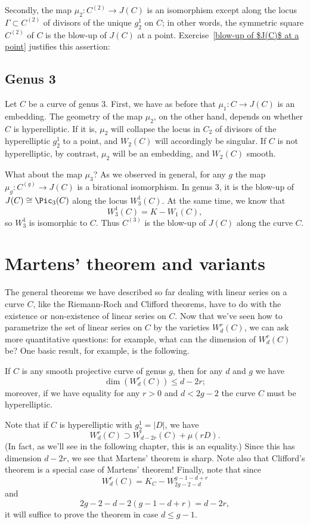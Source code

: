 Secondly, the map $\mu_2 : C^{(2)} \to J(C)$ is an isomorphism except along the locus $\Gamma \subset  C^{(2)} $ of divisors of the unique $g^1_2$ on $C$; in other words, the symmetric square $ C^{(2)} $ of $C$ is the blow-up of $J(C)$ at a point. Exercise~\ref{blow-up of $J(C)$ at a point} justifies this assertion:


\subsection{Genus 3}

Let $C$ be a curve of genus 3. First, we have as before that $\mu_1 : C \to J(C)$ is an embedding. The geometry of the map $\mu_2$, on the other hand, depends on whether  $C$ is hyperelliptic. If it is, $\mu_2$ will collapse the locus in $C_2$ of divisors of the hyperelliptic $g^1_2$ to a point, and $W_2(C)$ will accordingly be singular. If $C$ is not hyperelliptic, by contrast, $\mu_2$ will be an embedding, and $W_2(C)$ smooth.

What about the map $\mu_3$? As we observed in general, for any $g$ the map $\mu_g : C^{(g)} \to J(C)$ is a birational isomorphism. In genus 3, it is the blow-up of $J(C) \cong \Pic_3(C)$ along the locus $W^1_3(C)$. At the same time, we know that
$$
W^1_3(C) = K - W_1(C),
$$
so $W^1_3$ is isomorphic to $C$. Thus $C^{(3)}$ is the blow-up of $J(C)$ along the curve $C$.

\section{Martens' theorem and variants}

The general theorems we have described so far dealing with linear series on a curve $C$, like the Riemann-Roch and Clifford theorems, have to do with the existence or non-existence of linear series on $C$. Now that we've seen how to parametrize the set of linear series on $C$ by the varieties $W^r_d(C)$, we can ask more quantitative questions: for example, what can the dimension of $W^r_d(C)$ be? One basic result, for example, is the following.

\begin{theorem}
If $C$ is any smooth projective curve of genus $g$, then for any $d$ and $g$ we have
$$
\dim(W^r_d(C)) \leq d-2r;
$$
moreover, if we have equality for any $r > 0$ and $d < 2g-2$ the curve $C$ must be hyperelliptic.
\end{theorem}

Note that if $C$ is hyperelliptic with $g^1_2 = |D|$, we have
$$
W^r_d(C) \supset W_{d-2r}(C) + \mu(rD).
$$
(In fact, as we'll see in the following chapter, this is an equality.) Since this has dimension $d-2r$, we see that Martens' theorem is sharp. Note also that Clifford's theorem is a special case of Martens' theorem! Finally, note that since
$$
W^r_d(C) = K_C - W^{g-1-d+r}_{2g-2-d}
$$
and
$$
2g-2-d - 2(g-1-d+r) = d-2r,
$$
it will suffice to prove the theorem in case $d \leq g-1$.

